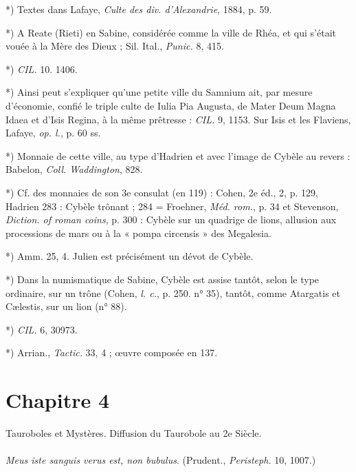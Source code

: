 \documentclass[a4paper, 11pt, oneside, polutonikogreek, french]{article}
\begin{document}
*) Textes dans Lafaye, \emph{Culte des div. d'Alexandrie}, 1884, p. 59.

*) A Reate (Rieti) en Sabine, considérée comme la ville de Rhéa, et qui s'était vouée à la Mère des Dieux ; Sil. Ital., \emph{Punic.} 8, 415.

*) \emph{CIL.} 10. 1406.

*) Ainsi peut s'expliquer qu'une petite ville du Samnium ait, par mesure d'économie, confié le triple culte de Iulia Pia Augusta, de Mater Deum Magna Idaea et d'Isis Regina, à la même prêtresse : \emph{CIL.} 9, 1153. Sur Isis et les Flaviens, Lafaye, \emph{op. l.}, p. 60 ss.

*) Monnaie de cette ville, au type d'Hadrien et avec l'image de Cybèle au revers : Babelon, \emph{Coll. Waddington}, 828.

*) Cf. des monnaies de son 3e consulat (en 119) : Cohen, 2e éd., 2, p. 129, Hadrien 283 : Cybèle trônant ; 284 = Froehner, \emph{Méd. rom.}, p. 34 et Stevenson, \emph{Diction. of roman coins}, p. 300 : Cybèle sur un quadrige de lions, allusion aux processions de mars ou à la « pompa circensis » des Megalesia.

*) Amm. 25, 4. Julien est précisément un dévot de Cybèle.

*) Dans la numismatique de Sabine, Cybèle est assise tantôt, selon le type ordinaire, sur un trône (Cohen, \emph{l. c.}, p. 250. n° 35), tantôt, comme Atargatis et Cælestis, sur un lion (n° 88).

*) \emph{CIL.} 6, 30973.

*) Arrian., \emph{Tactic.} 33, 4 ; œuvre composée en 137.
\clearpage
\section{Chapitre 4}
\begin{center}
Tauroboles et Mystères. Diffusion du Taurobole au 2e Siècle.
\end{center}
\paragraph{}
\emph{Meus iste sanguis verus est, non bubulus}. (Prudent., \emph{Peristeph.} 10, 1007.)
\end{document}
